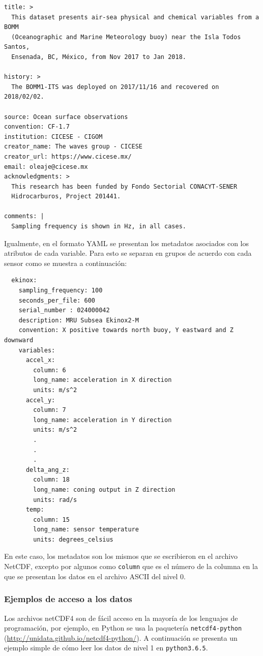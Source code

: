 \documentclass[11pt]{article}
\begin{document}
\begin{verbatim}
title: >
  This dataset presents air-sea physical and chemical variables from a BOMM
  (Oceanographic and Marine Meteorology buoy) near the Isla Todos Santos,
  Ensenada, BC, México, from Nov 2017 to Jan 2018.

history: >
  The BOMM1-ITS was deployed on 2017/11/16 and recovered on 2018/02/02.

source: Ocean surface observations
convention: CF-1.7
institution: CICESE - CIGOM
creator_name: The waves group - CICESE
creator_url: https://www.cicese.mx/
email: oleaje@cicese.mx
acknowledgments: >
  This research has been funded by Fondo Sectorial CONACYT-SENER
  Hidrocarburos, Project 201441.

comments: |
  Sampling frequency is shown in Hz, in all cases.
\end{verbatim}

Igualmente, en el formato YAML se presentan los metadatos asociados con los
atributos de cada variable. Para esto se separan en grupos de acuerdo con cada
sensor como se muestra a continuación:

\begin{verbatim}
  ekinox:
    sampling_frequency: 100
    seconds_per_file: 600
    serial_number : 024000042
    description: MRU Subsea Ekinox2-M
    convention: X positive towards north buoy, Y eastward and Z downward
    variables:
      accel_x:
        column: 6
        long_name: acceleration in X direction
        units: m/s^2
      accel_y:
        column: 7
        long_name: acceleration in Y direction
        units: m/s^2
        .
        .
        .
      delta_ang_z:
        column: 18
        long_name: coning output in Z direction
        units: rad/s
      temp:
        column: 15
        long_name: sensor temperature
        units: degrees_celsius
\end{verbatim}

En este caso, los metadatos son los mismos que se escribieron en el archivo
NetCDF, excepto por algunos como \texttt{column} que es el número de la columna
en la que se presentan los datos en el archivo ASCII del nivel 0.

\subsubsection*{Ejemplos de acceso a los datos}
\label{ssub:ejemplos_de_acceso_a_los_datos}

Los archivos netCDF4 son de fácil acceso en la mayoría de los lenguajes de
programación, por ejemplo, en Python se usa la paquetería
\texttt{netcdf4-python} (\url{http://unidata.github.io/netcdf4-python/}). A
continuación se presenta un ejemplo simple de cómo leer los datos de nivel 1 en
\texttt{python3.6.5}.
\end{document}
